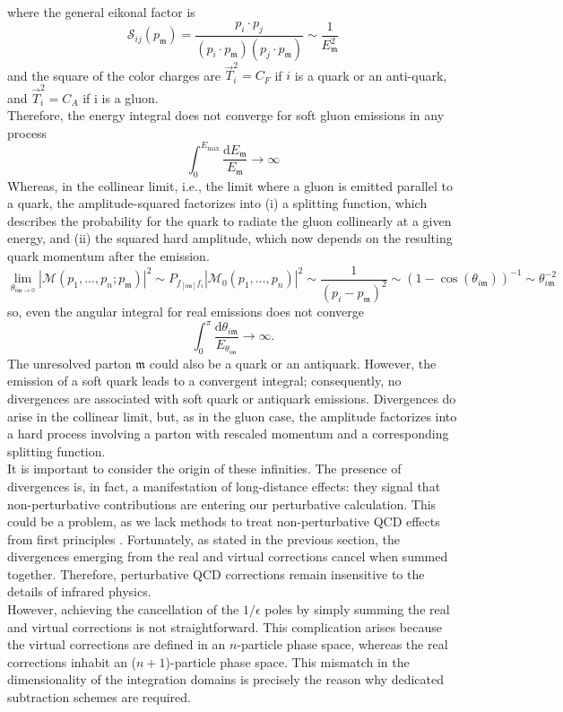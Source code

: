 \documentclass[a4paper, 12pt]{book}
\newcommand{\um}{\mathfrak{m}}
\begin{document}
where the general eikonal factor is
\begin{equation}
    \mathcal{S}_{ij}(p_\um) = \frac{p_i \cdot p_j}{(p_i \cdot p_\um)(p_j \cdot p_\um)} \sim \frac{1}{E_\um^2}
\end{equation}
and the square of the color charges are $\vec{T}_i^2= C_F$ if $i$ is a quark or an anti-quark, and $\vec{T}_i^2= C_A$ if i is a gluon. \\
Therefore, the energy integral does not converge for soft gluon emissions in any process
\begin{equation}
    \int_0^{E_{\mathrm{max}}} \frac{\mathrm{d}E_\um}{E_\um} \rightarrow \infty
\end{equation}
Whereas, in the collinear limit, i.e., the limit where a gluon is emitted parallel to a quark, the amplitude-squared factorizes into (i) a splitting function, which describes the probability for the quark to radiate the gluon collinearly at a given energy, and (ii) the squared hard amplitude, which now depends on the resulting quark momentum after the emission.
\begin{equation}
    \lim_{\theta_{i \um \rightarrow 0}}|\mathcal{M}(p_1, \dots, p_n; p_\um)|^2 \sim P_{f_{[i\um]}f_i} |\mathcal{M}_0(p_1, \dots, p_n)|^2 \sim \frac{1}{(p_i-p_\um)^2} \sim (1-\cos(\theta_{i\um}))^{-1}\sim \theta_{i\um}^{-2}
\end{equation}
so, even the angular integral for real emissions does not converge
\begin{equation}
    \int_0^{\pi} \frac{\mathrm{d}\theta_{i\um}}{E_{\theta_{i\um}}} \rightarrow \infty.
\end{equation}
The unresolved parton $\um$ could also be a quark or an antiquark. However, the emission of a soft quark leads to a convergent integral; consequently, no divergences are associated with soft quark or antiquark emissions. Divergences do arise in the collinear limit, but, as in the gluon case, the amplitude factorizes into a hard process involving a parton with rescaled momentum and a corresponding splitting function. \\
It is important to consider the origin of these infinities. The presence of divergences is, in fact, a manifestation of long-distance effects: they signal that non-perturbative contributions are entering our perturbative calculation. This could be a problem, as we lack methods to treat non-perturbative QCD effects from first principles \cite{Melnikov2018}. Fortunately, as stated in the previous section, the divergences emerging from the real and virtual corrections cancel when summed together. Therefore, perturbative QCD corrections remain insensitive to the details of infrared physics. \\
However, achieving the cancellation of the $1/\epsilon$ poles by simply summing the real and virtual corrections is not straightforward. This complication arises because the virtual corrections are defined in an $n$-particle phase space, whereas the real corrections inhabit an ($n+1$)-particle phase space. This mismatch in the dimensionality of the integration domains is precisely the reason why dedicated subtraction schemes are required.
\end{document}
